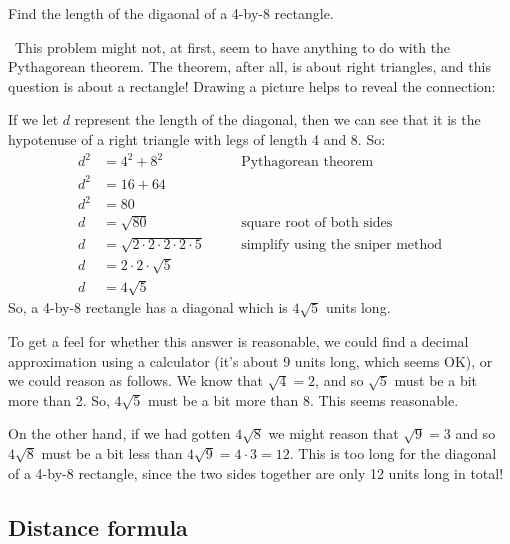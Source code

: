 \begin{boxedex}
Find the length of the digaonal of a 4-by-8 rectangle.

\exsoln\ This problem might not, at first, seem to have anything to do with the Pythagorean theorem. The theorem, after all, is about right triangles, and this question is about a rectangle! Drawing a picture helps to reveal the connection:

\begin{center}\end{center}

If we let $d$ represent the length of the diagonal, then we can see that it is the hypotenuse of a right triangle with legs of length 4 and 8. So:
\begin{align*}
d^2	&= 4^2 + 8^2
&&\quad\text{Pythagorean theorem}\\
d^2&= 16 + 64\\
d^2&= 80\\
d 	&= \sqrt{80}
&&\quad\text{square root of both sides}\\
d 	&= \sqrt{2 \cdot 2 \cdot 2 \cdot 2 \cdot 5}
&&\quad\text{simplify using the sniper method}\\
d 	&= 2 \cdot 2 \cdot \sqrt{5}\\
d 	&= 4\sqrt{5}
\end{align*}
So, a 4-by-8 rectangle has a diagonal which is $4\sqrt5$ units long.
\end{boxedex}

To get a feel for whether this answer is reasonable, we could find a decimal approximation using a calculator (it's about 9 units long, which seems OK), or we could reason as follows. We know that $\sqrt{4} = 2$, and so $\sqrt{5}$ must be a bit more than 2. So, $4\sqrt{5}$ must be a bit more than 8. This seems reasonable.

On the other hand, if we had gotten $4\sqrt{8}$ we might reason that $\sqrt{9} = 3$ and so $4\sqrt{8}$ must be a bit less than $4\sqrt{9} = 4\cdot3 = 12$. This is too long for the diagonal of a 4-by-8 rectangle, since the two sides together are only 12 units long in total!

\subsection{Distance formula}


